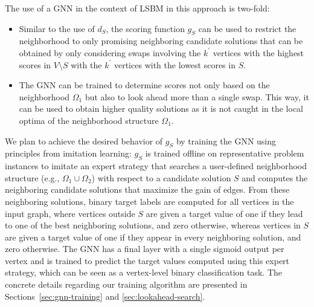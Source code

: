 \documentclass[draft,final]{vutinfth} %
\begin{document}
The use of a GNN in the context of LSBM in this approach is two-fold: 
\begin{itemize}
    \item Similar to the use of $d_S$, the scoring function $g_S$ can be used to restrict the neighborhood to only promising neighboring candidate solutions that can be obtained by only considering swaps involving the $k^\prime$ vertices with the highest scores in $V \setminus S$ with the $k^\prime$ vertices with the lowest scores in $S$. 
    \item The GNN can be trained to determine scores not only based on the neighborhood $\Omega_1$ but also to look ahead more than a single swap. This way, it can be used to obtain higher quality solutions as it is not caught in the local optima of the neighborhood structure $\Omega_1$.
\end{itemize}

We plan to achieve the desired behavior of $g_S$ by training the GNN using principles from imitation learning: 
$g_S$ is trained offline on representative problem instances to imitate an expert strategy that searches a user-defined neighborhood structure (e.g., $\Omega_1 \cup \Omega_2$) with respect to a candidate solution $S$ and computes the neighboring candidate solutions that maximize the gain of edges. From these neighboring solutions, binary target labels are computed for all vertices in the input graph, where vertices outside $S$ are given a target value of one if they lead to one of the best neighboring solutions, and zero otherwise, whereas vertices in $S$ are given a target value of one if they appear in every neighboring solution, and zero otherwise. 
The GNN has a final layer with a single sigmoid output per vertex and is trained to predict the target values computed using this expert strategy, which can be seen as a vertex-level binary classification task. The concrete details regarding our training algorithm are presented in Sections~\ref{sec:gnn-training} and \ref{sec:lookahead-search}.
\end{document}
